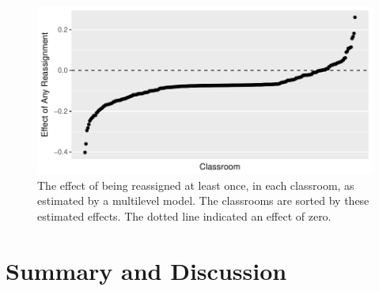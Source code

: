 \documentclass[notitlepage,12pt]{jedm}\usepackage[]{graphicx}\usepackage[]{color}
\makeatletter
\def\maxwidth{ %
  \ifdim\Gin@nat@width>\linewidth
    \linewidth
  \else
    \Gin@nat@width
  \fi
}
\makeatother
\begin{document}
\begin{figure}
  \centering

\includegraphics[width=\maxwidth]{figure/hetroPlot-1} 

\caption{The effect of being reassigned at least once, in each
  classroom, as estimated by a multilevel model. The classrooms are
  sorted by these estimated effects. The dotted line indicated an
  effect of zero.}
\label{fig:trtHet}
\end{figure}



\section{Summary and Discussion}\label{sec:discussion}
\end{document}
